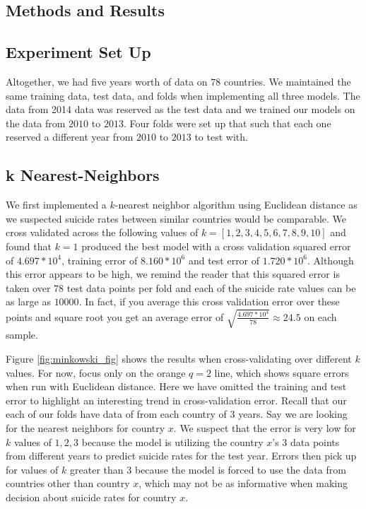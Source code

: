 \documentclass{article}
\begin{document}
\begin{multicols}{2}
\section{Methods and Results}
\subsection{Experiment Set Up} Altogether, we had five years worth of data on $78$ countries. We maintained the same training data, test data, and folds when implementing all three models. The data from 2014 data was reserved as the test data and we trained our models on the data from $2010$ to $2013$. Four folds were set up that such that each one reserved a different year from $2010$ to $2013$ to test with. 

\subsection{k Nearest-Neighbors} We first implemented a $k$-nearest neighbor algorithm using Euclidean distance as we suspected suicide rates between similar countries would be comparable. We cross validated across the following values of $k = [1,2, 3, 4, 5, 6, 7, 8, 9, 10]$ and found that $k = 1$ produced the best model with a cross validation squared error of $4.697 * 10^4$, training error of $8.160 * 10^6$ and test error of $1.720 * 10^6$. Although this error appears to be high, we remind the reader that this squared error is taken over $78$ test data points per fold and each of the suicide rate values can be as large as $10000$. In fact, if you average this cross validation error over these points and square root you get an average error of $\sqrt{\frac{4.697 * 10^4}{78}} \approx 24.5 $ on each sample. 

Figure \ref{fig:minkowski_fig} shows the results when cross-validating over different $k$ values. For now, focus only on the orange $q=2$ line, which shows square errors when run with Euclidean distance. Here we have omitted the training and test error to highlight an interesting trend in cross-validation error. Recall that our each of our folds have data of from each country of $3$ years. Say we are looking for the nearest neighbors for country $x$. We suspect that the error is very low for $k$ values of $1, 2, 3$ because the model is utilizing the country $x$'s $3$ data points from different years to predict suicide rates for the test year. Errors then pick up for values of $k$ greater than $3$ because the model is forced to use the data from countries other than country $x$, which may not be as informative when making decision about suicide rates for country $x$. 



\end{multicols}
\end{document}
